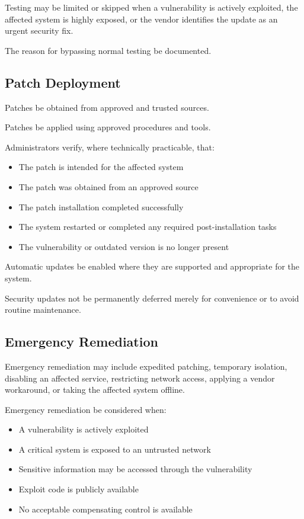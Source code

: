 Testing may be limited or skipped when a vulnerability is actively exploited, the affected system is highly exposed, or the vendor identifies the update as an urgent security fix.

The reason for bypassing normal testing \must{} be documented.

\subsection{Patch Deployment}

Patches \must{} be obtained from approved and trusted sources.

Patches \must{} be applied using approved procedures and tools.

Administrators \must{} verify, where technically practicable, that:
\begin{itemize}
    \item The patch is intended for the affected system
    \item The patch was obtained from an approved source
    \item The patch installation completed successfully
    \item The system restarted or completed any required post-installation tasks
    \item The vulnerability or outdated version is no longer present
\end{itemize}

Automatic updates \should{} be enabled where they are supported and appropriate for the system.

Security updates \must{} not be permanently deferred merely for convenience or to avoid routine maintenance.

\subsection{Emergency Remediation}

Emergency remediation may include expedited patching, temporary isolation, disabling an affected service, restricting network access, applying a vendor workaround, or taking the affected system offline.

Emergency remediation \must{} be considered when:
\begin{itemize}
    \item A vulnerability is actively exploited
    \item A critical system is exposed to an untrusted network
    \item Sensitive information may be accessed through the vulnerability
    \item Exploit code is publicly available
    \item No acceptable compensating control is available
\end{itemize}

